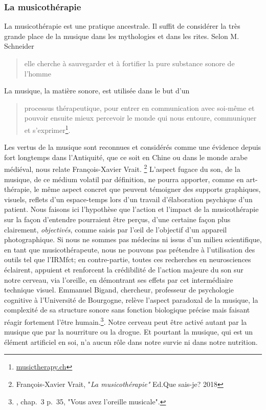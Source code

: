  



\subsubsection{La musicothérapie}
La musicothérapie est une pratique ancestrale. Il suffit de considérer la très grande  place de la musique dans les mythologies et dans les rites.  Selon M. Schneider
\begin{quote}
	elle cherche à sauvegarder et à fortifier la pure substance sonore de l'homme\autocite[Voir tome I, pp. 202--203]%
	[M. Schneider, <<\,Le rôle  de la musique dans la mythologie et les rites des civilisations non européennes\,>>]{schaeffner.ea:histoire}
\end{quote}

La musique, la matière sonore, est utilisée dans le but d'un 
\begin{quote}
	processus thérapeutique, pour entrer en communication avec soi-même et pouvoir ensuite mieux percevoir le monde qui nous
	entoure, communiquer et s'exprimer\footnote{%
		\href{http://www.musictherapy.ch/fr/musicotherapie/quest-ce-que-la-musicotherapie/}{musictherapy.ch}}.
\end{quote}

Les vertus de la musique sont reconnues et considérés comme une évidence depuis fort longtemps dans l'Antiquité, que ce soit en Chine ou dans le monde arabe médiéval, nous relate François-Xavier Vrait. \footnote{François-Xavier Vrait, "\textit{La musicothérapie"} Ed.Que sais-je? 2018}  
L'aspect fugace du son, de la musique, de ce médium volatil par
définition, ne pourra apporter, comme en art-thérapie, le
même aspect concret que peuvent témoigner des supports graphiques,
visuels, reflets d'un espace-temps lors d'un travail d'élaboration
psychique d'un patient. Nous faisons  ici l'hypothèse que l'action et l'impact de la
musicothérapie sur la façon d'entendre pourraient être perçus, d'une certaine façon plus
clairement, \textsl{objectivés}, comme saisis par l'\oe il de l'objectif d'un appareil
photographique.
Si nous ne sommes pas médecins ni issus d'un milieu scientifique, en tant que musicothérapeute, nous ne pouvons pas prétendre à l'utilisation des outils
 tel que l'IRMfct; en contre-partie, toutes ces recherches en
neurosciences éclairent, appuient et renforcent la crédibilité de l'action
majeure du son sur notre cerveau, via l'oreille, en démontrant ses effets par cet intermédiaire technique visuel.  Emmanuel Bigand, chercheur, professeur de
psychologie cognitive à l'Université de Bourgogne, relève l'aspect
paradoxal de la musique, la complexité de sa structure sonore sans
fonction biologique précise mais faisant réagir fortement l'être
humain.\footnote{\cite{bigand:cerveau}, chap.~3 p.~35, "Vous avez l'oreille musicale".}.  Notre cerveau peut être activé autant par
la musique que par la nourriture ou la drogue. Et pourtant la musique,
qui est un élément artificiel en soi, n'a aucun rôle dans notre survie ni dans
notre nutrition.


